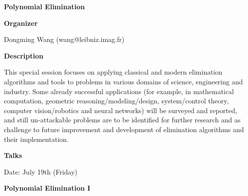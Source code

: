 \begin{center}
{\LARGE \bf Polynomial Elimination 
}
\end{center}
\bigskip

\noindent
{\bf Organizer}
\medskip

Dongming Wang (wang@leibniz.imag.fr)

\bigskip

\noindent
{\bf Description}
\medskip

This special session focuses on applying classical and modern elimination algorithms and tools to
problems in various domains of science, engineering and industry. Some already successful
applications (for example, in mathematical computation, geometric reasoning/modeling/design,
system/control theory, computer vision/robotics and neural networks) will be surveyed and
reported, and still un-attackable problems are to be identified for further research and as challenge
to future improvement and development of elimination algorithms and their implementation. 

\bigskip
\noindent
{\bf Talks}
\medskip

Date: July 19th (Friday) 

\begin{center}
{\Large \bf Polynomial Elimination I
}
\end{center}


